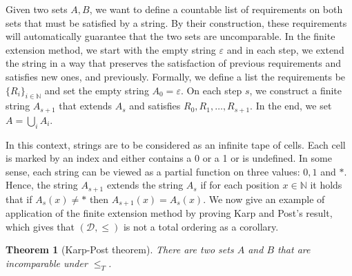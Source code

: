 \documentclass[12pt,a4paper]{article}
\newtheorem{theorem}{Theorem}
\theoremstyle{definition}
\newcommand{\N}{\mathbb{N}}                     %
\begin{document}
    Given two sets $A,B$, we want to define a countable list of requirements on both sets that must be satisfied by a string. By their construction, these requirements will automatically guarantee that the two sets are uncomparable. In the finite extension method, we start with the empty string $\varepsilon$ and in each step, we extend the string in a way that preserves the satisfaction of previous requirements and satisfies new ones, and previously. Formally, we define a list the requirements be $\{R_i\}_{i \in \N}$ and set the empty string $A_0 = \varepsilon$. On each step $s$, we construct a finite string $A_{s+1}$ that extends $A_s$ and satisfies $R_0, R_1, \ldots, R_{s+1}$. In the end, we set $A = \bigcup_{i} A_i$.
    
    In this context, strings are to be considered as an infinite tape of cells. Each cell is marked by an index and either contains a 0 or a 1 or is undefined. In some sense, each string can be viewed as a partial function on three values: $0, 1$ and $*$. Hence, the string $A_{s+1}$ extends the string $A_s$ if for each position $x \in \N$ it holds that if $A_s(x) \neq *$ then $A_{s+1}(x) = A_{s}(x)$. We now give an example of application of the finite extension method by proving Karp and Post's result, which gives that $(\mathcal{D}, \leq)$ is not a total ordering as a corollary.

    \begin{theorem}[Karp-Post theorem]
        There are two sets $A$ and $B$ that are incomparable under $\leq_T$.
    \end{theorem}
\end{document}
